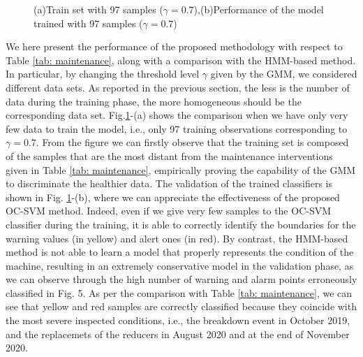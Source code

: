 \begin{figure}[h!]
    \begin{subfigure}{.5\textwidth}    
    \centering
    
    
    \end{subfigure}
        \begin{subfigure}{.5\textwidth}
    \centering
    
     
    \end{subfigure}
\caption{(a)Train set with 97 samples ($\gamma=0.7$),(b)Performance of the model trained with 97 samples ($\gamma=0.7$)}
    \label{fig:Trai-testsmall}
\end{figure}
We here present the performance of the proposed methodology with respect to Table \ref{tab: maintenance}, along with a comparison with the HMM-based method. In particular, by changing the threshold level $\gamma$ given by the GMM, we considered different data sets. As reported in the previous section, the less is the number of data during the training phase, the more homogeneous should be the corresponding data set. Fig.\ref{fig:Trai-testsmall}-(a) shows the comparison when we have only very few data to train the model, i.e., only 97 training observations corresponding to $\gamma=0.7$. From the figure we can firstly observe that the training set is composed of the samples
that are the most distant from the maintenance interventions given in Table \ref{tab: maintenance}, empirically proving the capability of the GMM to discriminate the healthier data. The validation of the trained classifiers is shown in Fig. \ref{fig:Trai-testsmall}-(b), where we can appreciate the effectiveness of the proposed OC-SVM method. Indeed, even if we give very few samples to the OC-SVM classifier during the training, it is able to correctly identify the boundaries for the warning values (in yellow) and alert ones (in red). By contrast, the HMM-based method is not able to learn a model that properly represents the condition of the machine, resulting in an extremely conservative model in the validation phase, as we can observe through the high number of warning and alarm points erroneously classified in Fig. 5. As per the comparison with Table \ref{tab: maintenance}, we can see that yellow and red samples are correctly classified because they coincide with the most severe inspected conditions, i.e., the breakdown event in October 2019, and the replacemets of the reducers in August 2020 and at the end of November 2020.
